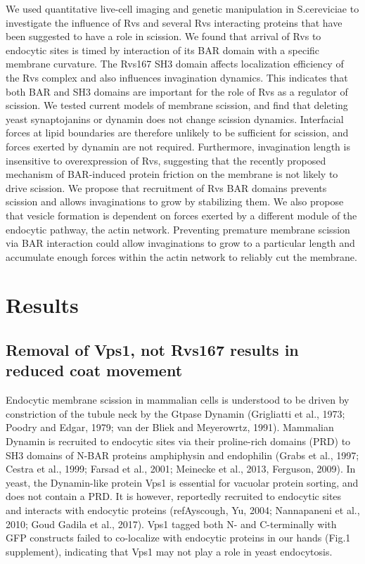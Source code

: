 \documentclass[9pt,lineno]{elife}
\begin{document}
We used quantitative live-cell imaging and genetic manipulation in S.cereviciae to investigate the influence of Rvs and several Rvs interacting proteins that have been suggested to have a role in scission. We found that arrival of Rvs to endocytic sites is timed by interaction of its BAR domain with a specific membrane curvature. The Rvs167 SH3 domain affects localization efficiency of the Rvs complex and also influences invagination dynamics. This indicates that both BAR and SH3 domains are important for the role of Rvs as a regulator of scission. We tested current models of membrane scission, and find that deleting yeast synaptojanins or dynamin does not change scission dynamics. Interfacial forces at lipid boundaries are therefore unlikely to be sufficient for scission, and forces exerted by dynamin are not required. Furthermore, invagination length is insensitive to overexpression of Rvs, suggesting that the recently proposed mechanism of BAR-induced protein friction on the membrane is not likely to drive scission. We propose that recruitment of Rvs BAR domains prevents scission and allows invaginations to grow by stabilizing them. We also propose that vesicle formation is dependent on forces exerted by a different module of the endocytic pathway, the actin network. Preventing premature membrane scission via BAR interaction could allow invaginations to grow to a particular length and accumulate enough forces within the actin network to reliably cut the membrane. 


\section{Results}

\subsection{Removal of Vps1, not Rvs167 results in reduced coat movement}

Endocytic membrane scission in mammalian cells is understood to be driven by constriction of the tubule neck by the Gtpase Dynamin (Grigliatti et al., 1973; Poodry and Edgar, 1979; van der Bliek and Meyerowrtz, 1991). Mammalian Dynamin is recruited to endocytic sites via their proline-rich domains (PRD) to SH3 domains of N-BAR proteins amphiphysin and endophilin (Grabs et al., 1997; Cestra et al., 1999; Farsad et al., 2001; Meinecke et al., 2013, Ferguson, 2009). In yeast, the Dynamin-like protein Vps1 is essential for vacuolar protein sorting, and does not contain a PRD. It is however, reportedly recruited to endocytic sites and interacts with endocytic proteins (refAyscough, Yu, 2004; Nannapaneni et al., 2010; Goud Gadila et al., 2017). Vps1 tagged both N- and C-terminally with GFP constructs failed to co-localize with endocytic proteins in our hands (Fig.1 supplement), indicating that Vps1 may not play a role in yeast endocytosis. 
\end{document}
